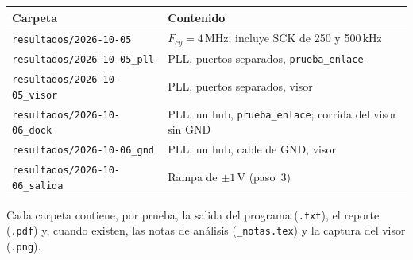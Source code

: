 \documentclass[11pt]{article}
\newcommand{\code}[1]{\texttt{#1}}
\begin{document}
\begin{table}[H]
\centering
\small
\begin{tabularx}{\linewidth}{@{}lX@{}}
\toprule
Carpeta & Contenido \\
\midrule
\code{resultados/2026-10-05} & $F_{cy} = 4$\,MHz; incluye SCK de 250 y 500\,kHz \\
\code{resultados/2026-10-05\_pll} & PLL, puertos separados, \code{prueba\_enlace} \\
\code{resultados/2026-10-05\_visor} & PLL, puertos separados, visor \\
\code{resultados/2026-10-06\_dock} & PLL, un hub, \code{prueba\_enlace}; corrida del visor sin GND \\
\code{resultados/2026-10-06\_gnd} & PLL, un hub, cable de GND, visor \\
\code{resultados/2026-10-06\_salida} & Rampa de $\pm1$\,V (paso~3) \\
\bottomrule
\end{tabularx}
\end{table}

Cada carpeta contiene, por prueba, la salida del programa (\code{.txt}), el
reporte (\code{.pdf}) y, cuando existen, las notas de análisis
(\code{\_notas.tex}) y la captura del visor (\code{.png}).
\end{document}
